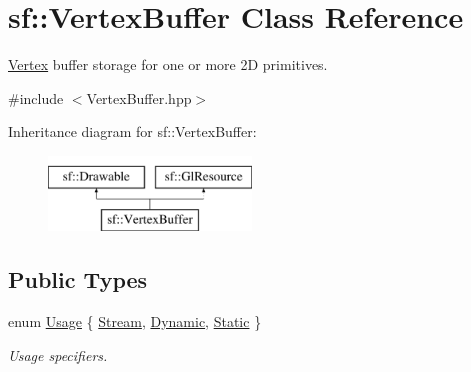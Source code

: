 \hypertarget{classsf_1_1_vertex_buffer}{}\section{sf\+:\+:Vertex\+Buffer Class Reference}
\label{classsf_1_1_vertex_buffer}


\mbox{\hyperlink{classsf_1_1_vertex}{Vertex}} buffer storage for one or more 2D primitives.  




{\ttfamily \#include $<$Vertex\+Buffer.\+hpp$>$}

Inheritance diagram for sf\+:\+:Vertex\+Buffer\+:\begin{figure}[H]
\begin{center}
\leavevmode
\includegraphics[height=2.000000cm]{classsf_1_1_vertex_buffer}
\end{center}
\end{figure}
\subsection*{Public Types}
\begin{DoxyCompactItemize}
\item 
enum \mbox{\hyperlink{classsf_1_1_vertex_buffer_a3a531528684e63ecb45edd51282f5cb7}{Usage}} \{ \mbox{\hyperlink{classsf_1_1_vertex_buffer_a3a531528684e63ecb45edd51282f5cb7aeed06a391698772af58a9cfdff77deaf}{Stream}}, 
\mbox{\hyperlink{classsf_1_1_vertex_buffer_a3a531528684e63ecb45edd51282f5cb7a13365282a5933ecd9cc6a3ef39ba58f7}{Dynamic}}, 
\mbox{\hyperlink{classsf_1_1_vertex_buffer_a3a531528684e63ecb45edd51282f5cb7a041ab564f6cd1b6775bd0ebff06b6d7e}{Static}}
 \}
\begin{DoxyCompactList}\small\item\em Usage specifiers. \end{DoxyCompactList}\end{DoxyCompactItemize}
